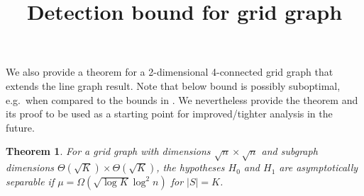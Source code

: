 \documentclass{article}
\title{Detection bound for grid graph}
\newtheorem{theorem}{Theorem}[section]
\begin{document}
\maketitle

We also provide a theorem for a 2-dimensional 4-connected grid graph that extends the line graph result.
Note that below bound is possibly suboptimal, e.g.\ when compared to the bounds in \cite{nips14}. We nevertheless provide the theorem and its proof to be used as a starting point for improved/tighter analysis in the future.

\begin{theorem}\label{thm:poisson_grid}
  For a grid graph with dimensions $\sqrt{n} \times \sqrt{n}$ and subgraph dimensions $\Theta(\sqrt{K}) \times \Theta(\sqrt{K})$, the hypotheses $H_0$ and $H_1$ are asymptotically separable if $\mu = \Omega( \sqrt{\log K} \log^2 n )$ for $|S| = K$.
\end{theorem}
\end{document}
